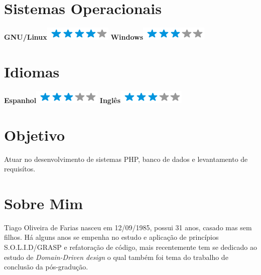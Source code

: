 \documentclass[]{friggeri-cv}
\begin{document}
\begin{aside}
  \section{Sistemas Operacionais}
    \textbf{GNU/Linux}\includegraphics[scale=0.40]{img/4stars.png}
    \textbf{Windows}\includegraphics[scale=0.40]{img/3stars.png}
    ~
  \section{Idiomas}
    \textbf{Espanhol}\includegraphics[scale=0.40]{img/3stars.png}
    \textbf{Inglês}\includegraphics[scale=0.40]{img/3stars.png}
\end{aside}

\section{Objetivo}
Atuar no desenvolvimento de sistemas PHP, banco de dados e levantamento de requisítos.

\section{Sobre Mim}
Tiago Oliveira de Farias nasceu em 12/09/1985, possui 31 anos, casado mas sem filhos. Há alguns anos se empenha no estudo e aplicação de princípios S.O.L.I.D/GRASP e refatoração de código, mais recentemente tem se dedicado ao estudo de \textit{Domain-Driven design} o qual também foi tema do trabalho de conclusão da pós-gradução.
\end{document}
